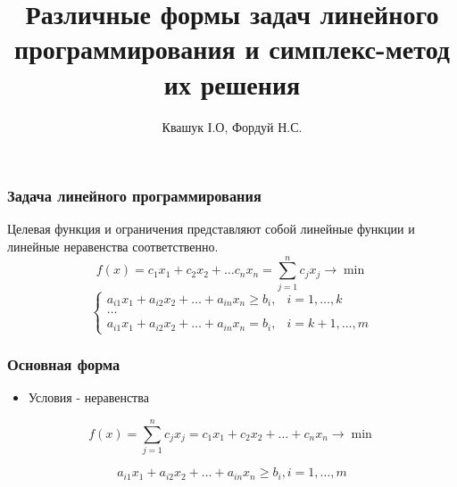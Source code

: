 \documentclass[12pt]{beamer}
\begin{document}
	\author{Квашук І.О, Фордуй Н.С.}
	\title{Различные формы задач линейного программирования и
		симплекс-метод их решения}
	\begin{frame}[plain]
		\begin{titlepage}
		\end{titlepage}
	\end{frame}
	\begin{frame}
		\frametitle{Задача линейного программирования}
		Целевая функция и ограничения представляют собой линейные функции и линейные неравенства соответственно. 
		\begin{equation*}
			f(x)=c_1 x_1+c_2 x_2+\dots c_n x_n=\sum_{j=1}^n c_j x_j \to \min
		\end{equation*}
		\begin{equation*}
			\begin{cases}	
				a_{i1}x_1+a_{i2}x_2+\dots + a_{in} x_n\geq b_i, &  i=1,\dots, k\\
				\dots \\
				a_{i1}x_1+a_{i2}x_2+\dots + a_{in} x_n= b_i, & i=k+1,\dots,m
			\end{cases}
		\end{equation*}
	\end{frame}
	\begin{frame}
		\frametitle{Основная форма}
		\begin{itemize}
			\item Условия - неравенства 
		\end{itemize}
		\begin{equation*}
			f(x)=\sum_{j=1}^n c_j x_j = c_1 x_1+c_2 x_2+\dots + c_n x_n \to \min
		\end{equation*}
		
		\begin{equation*}
			a_{i1}x_1+a_{i2}x_2+\dots + a_{in} x_n \geq b_i, i=1,\dots, m
		\end{equation*}
	\end{frame}
	
\end{document}
